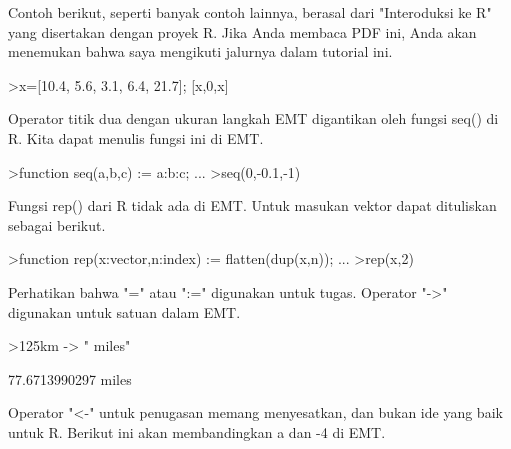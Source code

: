 \documentclass[a4paper,10pt]{article}
\begin{document}
\begin{eulernotebook}
\begin{eulercomment}
\begin{eulercomment}
\begin{eulercomment}
\begin{eulercomment}
\begin{eulercomment}
\begin{eulercomment}
\begin{eulercomment}
Contoh berikut, seperti banyak contoh lainnya, berasal dari
"Interoduksi ke R" yang disertakan dengan proyek R. Jika Anda membaca
PDF ini, Anda akan menemukan bahwa saya mengikuti jalurnya dalam
tutorial ini.
\end{eulercomment}
\begin{eulerprompt}
>x=[10.4, 5.6, 3.1, 6.4, 21.7]; [x,0,x]
\end{eulerprompt}
\begin{euleroutput}
  [10.4,  5.6,  3.1,  6.4,  21.7,  0,  10.4,  5.6,  3.1,  6.4,  21.7]
\end{euleroutput}
\begin{eulercomment}
Operator titik dua dengan ukuran langkah EMT digantikan oleh fungsi
seq() di R. Kita dapat menulis fungsi ini di EMT.
\end{eulercomment}
\begin{eulerprompt}
>function seq(a,b,c) := a:b:c; ...
>seq(0,-0.1,-1)
\end{eulerprompt}
\begin{euleroutput}
  [0,  -0.1,  -0.2,  -0.3,  -0.4,  -0.5,  -0.6,  -0.7,  -0.8,  -0.9,  -1]
\end{euleroutput}
\begin{eulercomment}
Fungsi rep() dari R tidak ada di EMT. Untuk masukan vektor dapat
dituliskan sebagai berikut.
\end{eulercomment}
\begin{eulerprompt}
>function rep(x:vector,n:index) := flatten(dup(x,n)); ...
>rep(x,2)
\end{eulerprompt}
\begin{euleroutput}
  [10.4,  5.6,  3.1,  6.4,  21.7,  10.4,  5.6,  3.1,  6.4,  21.7]
\end{euleroutput}
\begin{eulercomment}
Perhatikan bahwa "=" atau ":=" digunakan untuk tugas. Operator "-\textgreater{}"
digunakan untuk satuan dalam EMT.
\end{eulercomment}
\begin{eulerprompt}
>125km -> " miles"
\end{eulerprompt}
\begin{euleroutput}
  77.6713990297 miles
\end{euleroutput}
\begin{eulercomment}
Operator "\textless{}-" untuk penugasan memang menyesatkan, dan bukan ide yang
baik untuk R. Berikut ini akan membandingkan a dan -4 di EMT.
\end{eulercomment}
\begin{eulerprompt}

\end{eulerprompt}
\end{eulercomment}
\end{eulercomment}
\end{eulercomment}
\end{eulercomment}
\end{eulercomment}
\end{eulercomment}
\end{eulernotebook}
\end{document}
